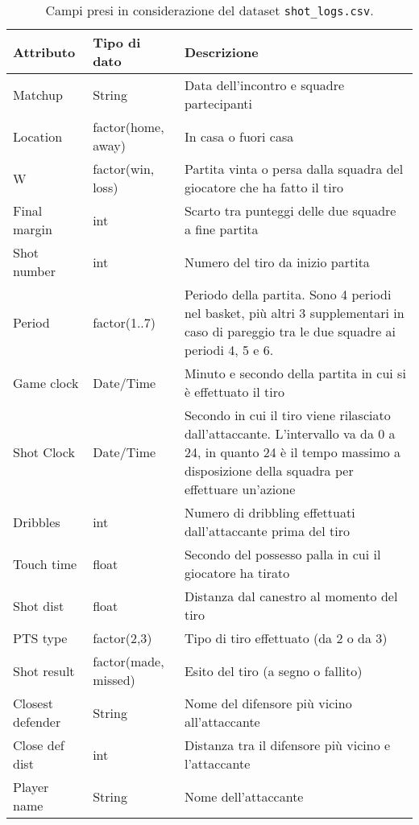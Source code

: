 \begin{center}
	\begin{longtable}[m]{|m{8em} m{7em} m{16em}|} 


		\caption{Campi presi in considerazione del dataset \texttt{shot\_logs.csv}.\label{tabella_shot_logs}}\\

		\hline
		\bfseries{Attributo} & \bfseries{Tipo di dato} & \bfseries{Descrizione} \\
		\hline
		Matchup & String & Data dell'incontro e squadre partecipanti \\
		\hline
		Location & factor(home, away) & In casa o fuori casa \\
		\hline
		W & factor(win, loss) & Partita vinta o persa dalla squadra del giocatore che ha fatto il tiro \\ 
		\hline
		Final margin & int & Scarto tra punteggi delle due squadre a fine partita \\ 
		\hline
		Shot number & int & Numero del tiro da inizio partita \\ 
		\hline
		Period & factor(1..7) & Periodo della partita. Sono 4 periodi nel basket, più altri 3 supplementari in caso di pareggio tra le due squadre ai periodi 4, 5 e 6. \\ 
		\hline
		Game clock & Date/Time & Minuto e secondo della partita in cui si è effettuato il tiro \\ 
		\hline
		Shot Clock & Date/Time & Secondo in cui il tiro viene rilasciato dall’attaccante. L’intervallo va da 0 a 24, in quanto 24 è il tempo massimo a disposizione della squadra per effettuare un’azione \\ 
		\hline
		Dribbles & int & Numero di dribbling effettuati dall’attaccante prima del tiro \\ 
		\hline
		Touch time & float & Secondo del possesso palla in cui il giocatore ha tirato \\ 
		\hline
		Shot dist & float & Distanza dal canestro al momento del tiro \\ 
		\hline
		PTS type & factor(2,3) & Tipo di tiro effettuato (da 2 o da 3) \\ 
		\hline
		Shot result & factor(made, missed) & Esito del tiro (a segno o fallito) \\ 
		\hline
		Closest defender & String & Nome del difensore più vicino all’attaccante \\ 
		\hline
		Close def dist & int & Distanza tra il difensore più vicino e l’attaccante \\ 
		\hline
		Player name & String & Nome dell’attaccante \\ 
		\hline
	\end{longtable}
\end{center}

